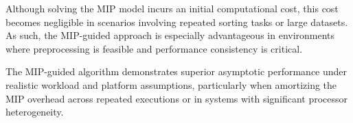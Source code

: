 \documentclass[]{interact}
\theoremstyle{plain}
\theoremstyle{definition}
\theoremstyle{remark}
\begin{document}
Although solving the MIP model incurs an initial computational cost, this cost becomes negligible in scenarios involving repeated sorting tasks or large datasets. As such, the MIP-guided approach is especially advantageous in environments where preprocessing is feasible and performance consistency is critical.

The MIP-guided algorithm demonstrates superior asymptotic performance under realistic workload and platform assumptions, particularly when amortizing the MIP overhead across repeated executions or in systems with significant processor heterogeneity.








\end{document}
